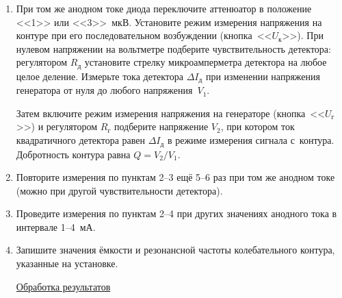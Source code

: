 \begin{lab:task}
\begin{enumerate}
\begin{figure}[h!]
	\caption{Схема установки для измерения напряжения на генераторе}
\end{figure}

С помощью регулятора $R_{\text{г}}$ и аттенюатора (пределы <<30>>, <<100>> или <<300>>~мкВ) установите ~$I_{\text{д}}$, которое было выбрано в~режиме измерения шума. Регулятор $R_{\text{д}}$ во время этой процедуры, конечно, трогать
нельзя. Отсчитанное по вольтметру с аттенюатором напряжение~$U_{\text{эфф}}$ равно корню квадратному из среднего квадрата
напряжения шумов.
		\begin{center}
			\underline{Измерение добротности контура}
		\end{center}
	\item При том же анодном токе диода переключите аттенюатор в положение <<1>> или <<3>>~мкВ. Установите режим измерения
напряжения на контуре при его последовательном возбуждении (кнопка~<<$U_{\text{к}}$>>). При нулевом напряжении на вольтметре
подберите чувствительность детектора: регулятором $R_{\text{д}}$ установите стрелку микроамперметра детектора на любое целое
деление. Измерьте  тока детектора $\Delta I_{\text{д}}$ при изменении напряжения генератора от нуля до любого
напряжения~$V_1$.

Затем включите режим измерения напряжения на генераторе (кнопка~<<$U_{\text{г}}$>>) и регулятором $R_{\text{г}}$ подберите напряжение
$V_2$, при котором ток квадратичного детектора равен  $\Delta I_{\text{д}}$ в режиме измерения сигнала с~контура.
Добротность контура равна $Q=V_2/V_1$.

	\item Повторите измерения по пунктам 2--3 ещё 5--6 раз при том же анодном токе (можно при другой
чувствительности детектора).

	\item Проведите измерения по пунктам 2--4 при других значениях анодного тока в интервале 1--4~мА.

	\item Запишите значения ёмкости и резонансной частоты колебательного контура, указанные на установке.

		    \begin{center}
		    \underline{Обработка результатов}
		    \end{center}


\end{enumerate}
\end{lab:task}
